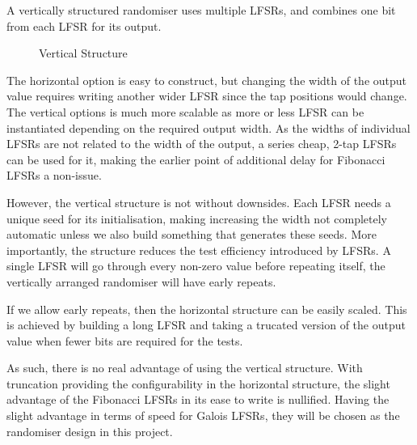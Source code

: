 A vertically structured randomiser uses multiple LFSRs, and combines one bit from each LFSR for its output.

\begin{figure}[ht]
  \centering
  
  \caption{Vertical Structure}
  \label{VertLFSR}
\end{figure}

The horizontal option is easy to construct, but changing the width of the output value requires writing another wider LFSR since the tap positions would change.
The vertical options is much more scalable as more or less LFSR can be instantiated depending on the required output width.
As the widths of individual LFSRs are not related to the width of the output, a series cheap, 2-tap LFSRs can be used for it, making the earlier point of additional delay for Fibonacci LFSRs a non-issue.

However, the vertical structure is not without downsides.
Each LFSR needs a unique seed for its initialisation, making increasing the width not completely automatic unless we also build something that generates these seeds.
More importantly, the structure reduces the test efficiency introduced by LFSRs.
A single LFSR will go through every non-zero value before repeating itself, the vertically arranged randomiser will have early repeats.

If we allow early repeats, then the horizontal structure can be easily scaled.
This is achieved by building a long LFSR and taking a trucated version of the output value when fewer bits are required for the tests.

As such, there is no real advantage of using the vertical structure.
With truncation providing the configurability in the horizontal structure, the slight advantage of the Fibonacci LFSRs in its ease to write is nullified.
Having the slight advantage in terms of speed for Galois LFSRs, they will be chosen as the randomiser design in this project.
